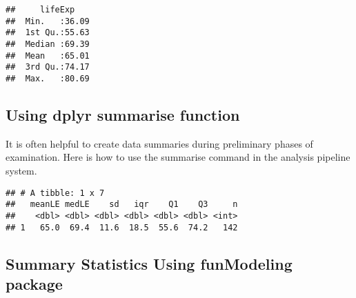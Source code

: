 \documentclass[]{book}
\newenvironment{Shaded}{\begin{snugshade}}{\end{snugshade}}
\newcommand{\KeywordTok}[1]{\textcolor[rgb]{0.13,0.29,0.53}{\textbf{#1}}}
\newcommand{\DataTypeTok}[1]{\textcolor[rgb]{0.13,0.29,0.53}{#1}}
\newcommand{\DecValTok}[1]{\textcolor[rgb]{0.00,0.00,0.81}{#1}}
\newcommand{\FloatTok}[1]{\textcolor[rgb]{0.00,0.00,0.81}{#1}}
\newcommand{\StringTok}[1]{\textcolor[rgb]{0.31,0.60,0.02}{#1}}
\newcommand{\OtherTok}[1]{\textcolor[rgb]{0.56,0.35,0.01}{#1}}
\newcommand{\OperatorTok}[1]{\textcolor[rgb]{0.81,0.36,0.00}{\textbf{#1}}}
\newcommand{\NormalTok}[1]{#1}
\begin{document}
\begin{verbatim}
##     lifeExp     
##  Min.   :36.09  
##  1st Qu.:55.63  
##  Median :69.39  
##  Mean   :65.01  
##  3rd Qu.:74.17  
##  Max.   :80.69
\end{verbatim}

\subsection{Using dplyr summarise
function}\label{using-dplyr-summarise-function}

It is often helpful to create data summaries during preliminary phases
of examination. Here is how to use the summarise command in the analysis
pipeline system.

\begin{Shaded}
\end{Shaded}

\begin{verbatim}
## # A tibble: 1 x 7
##   meanLE medLE    sd   iqr    Q1    Q3     n
##    <dbl> <dbl> <dbl> <dbl> <dbl> <dbl> <int>
## 1   65.0  69.4  11.6  18.5  55.6  74.2   142
\end{verbatim}

\subsection{Summary Statistics Using funModeling
package}\label{summary-statistics-using-funmodeling-package}
\end{document}
